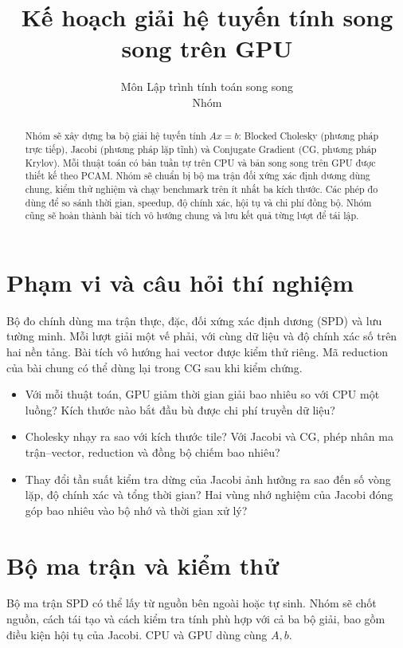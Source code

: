 \documentclass[11pt,a4paper]{article}
\title{Kế hoạch giải hệ tuyến tính song song trên GPU}
\author{Môn Lập trình tính toán song song \\ Nhóm \dien{Tên nhóm và thành viên}}
\date{}
\begin{document}
\maketitle

\begin{abstract}
Nhóm sẽ xây dựng ba bộ giải hệ tuyến tính $Ax=b$: Blocked Cholesky
(phương pháp trực tiếp), Jacobi (phương pháp lặp tĩnh) và Conjugate
Gradient (CG, phương pháp Krylov). Mỗi thuật toán có bản tuần tự trên
CPU và bản song song trên GPU được thiết kế theo PCAM. Nhóm sẽ chuẩn bị
bộ ma trận đối xứng xác định dương dùng chung, kiểm thử nghiệm và chạy
benchmark trên ít nhất ba kích thước. Các phép đo dùng để so sánh thời
gian, speedup, độ chính xác, hội tụ và chi phí đồng bộ. Nhóm cũng sẽ
hoàn thành bài tích vô hướng chung và lưu kết quả từng lượt để tái lập.
\end{abstract}

\section{Phạm vi và câu hỏi thí nghiệm}

Bộ đo chính dùng ma trận thực, đặc, đối xứng xác định dương (SPD) và
lưu tường minh. Mỗi lượt giải một vế phải, với cùng dữ liệu và độ chính
xác số trên hai nền tảng. Bài tích vô hướng hai vector được kiểm thử riêng.
Mã reduction của bài chung có thể dùng lại trong CG sau khi kiểm chứng.

\begin{itemize}
  \item Với mỗi thuật toán, GPU giảm thời gian giải bao nhiêu so với CPU
        một luồng? Kích thước nào bắt đầu bù được chi phí truyền dữ liệu?
  \item Cholesky nhạy ra sao với kích thước tile? Với Jacobi và CG,
        phép nhân ma trận--vector, reduction và đồng bộ chiếm bao nhiêu?
  \item Thay đổi tần suất kiểm tra dừng của Jacobi ảnh hưởng ra sao đến
        số vòng lặp, độ chính xác và tổng thời gian? Hai vùng nhớ nghiệm
        của Jacobi đóng góp bao nhiêu vào bộ nhớ và thời gian xử lý?
\end{itemize}

\section{Bộ ma trận và kiểm thử}

Bộ ma trận SPD có thể lấy từ nguồn bên ngoài hoặc tự sinh. Nhóm sẽ
chốt nguồn, cách tái tạo và cách kiểm tra tính phù hợp với cả ba bộ giải,
bao gồm điều kiện hội tụ của Jacobi. CPU và GPU dùng cùng $A,b$.
\end{document}
